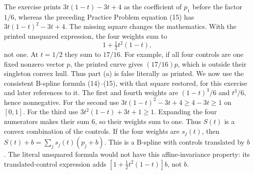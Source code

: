 The exercise prints $3t(1-t)-3t+4$ as the coefficient of $p_1$ before the
factor $1/6$, whereas the preceding Practice Problem equation (15) has
$3t(1-t)^2-3t+4$. The missing square changes the mathematics.
With the printed unsquared expression, the four weights sum to
\[
 1+\tfrac12t^2(1-t),
\]
not one. At $t=1/2$ they sum to $17/16$. For example, if all four controls
are one fixed nonzero vector $p$, the printed curve gives $(17/16)p$,
which is outside their singleton convex hull. Thus part (a) is false
literally as printed. We now use the consistent B-spline formula (14)--(15),
with that square restored, for this exercise and later references to it.
The first and fourth weights are $(1-t)^3/6$ and $t^3/6$, hence nonnegative.
For the second use $3t(1-t)^2-3t+4\ge4-3t\ge1$ on $[0,1]$.
For the third use $3t^2(1-t)+3t+1\ge1$.
Expanding the four numerators makes their sum $6$, so their weights sum
to one. Thus $S(t)$ is a convex combination of the controls.
If the four weights are $s_j(t)$, then
$S(t)+b=\sum_j s_j(t)(p_j+b)$.
This is a B-spline with controls translated by $b$.
The literal unsquared formula would not have this affine-invariance property:
its translated-control expression adds $[1+\tfrac12t^2(1-t)]b$, not $b$.

